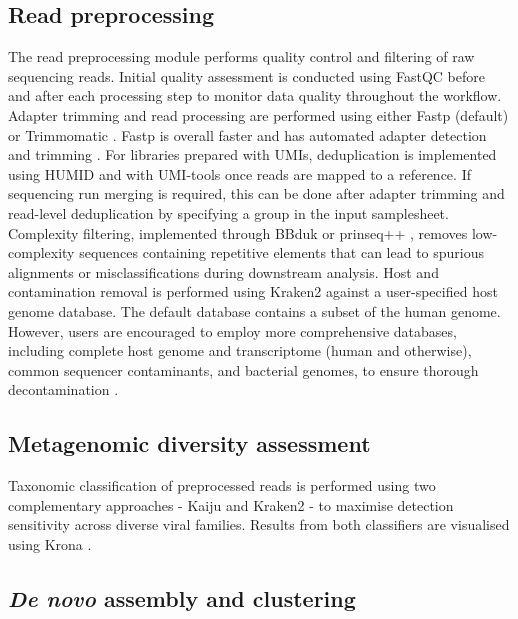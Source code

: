 \subsection{Read preprocessing}

The read preprocessing module performs quality control and filtering of raw sequencing reads. Initial quality assessment is conducted using FastQC before and after each processing step to monitor data quality throughout the workflow. Adapter trimming and read processing are performed using either Fastp \cite{Chen2018-tu} (default) or Trimmomatic \cite{Bolger2014-si}. Fastp is overall faster and has automated adapter detection and trimming \cite{Chen2018-tu}. For libraries prepared with UMIs, deduplication is implemented using HUMID \cite{LarosUnknown-nx} and with UMI-tools \cite{Smith2017-nk} once reads are mapped to a reference. If sequencing run merging is required, this can be done after adapter trimming and read-level deduplication by specifying a group in the input samplesheet. Complexity filtering, implemented through BBduk \cite{BushnellUnknown-qy} or prinseq++ \cite{Cantu2019-vs}, removes low-complexity sequences containing repetitive elements that can lead to spurious alignments or misclassifications during downstream analysis. Host and contamination removal is performed using Kraken2 \cite{Wood2019-jl} against a user-specified host genome database. The default database contains a subset of the human genome. However, users are encouraged to employ more comprehensive databases, including complete host genome and transcriptome (human and otherwise), common sequencer contaminants, and bacterial genomes, to ensure thorough decontamination \cite{Forbes2025-mv}.

\subsection{Metagenomic diversity assessment}

Taxonomic classification of preprocessed reads is performed using two complementary approaches - Kaiju \cite{Menzel2016-tz} and Kraken2 \cite{Wood2019-jl} - to maximise detection sensitivity across diverse viral families. Results from both classifiers are visualised using Krona \cite{Ondov2011-yp}.

\subsection{{\it De novo} assembly and clustering}

